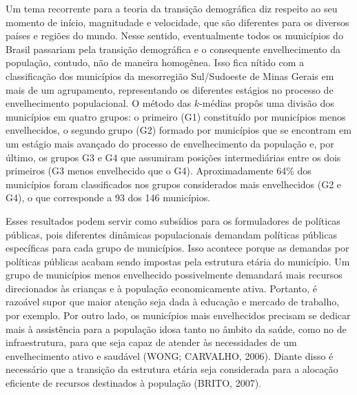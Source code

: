 \documentclass[10pt,twoside]{article}
\begin{document}
Um tema recorrente para a teoria da transição demográfica diz respeito ao seu momento de início, magnitudade e velocidade, que são diferentes para os diversos países e regiões do mundo. Nesse sentido, eventualmente todos os municípios do Brasil passariam pela transição demográfica e o consequente envelhecimento da população, contudo, não de maneira homogênea. Isso fica nítido com a classificação dos municípios da mesorregião Sul/Sudoeste de Minas Gerais em mais de um agrupamento, representando os diferentes estágios no processo de envelhecimento populacional. O método das $k$-médias propôs uma divisão dos municípios em quatro grupos: o primeiro (G1) constituído por municípios menos envelhecidos, o segundo grupo (G2) formado por municípios que se encontram em um estágio mais avançado do processo de envelhecimento da população e, por último, os grupos G3 e G4 que assumiram posições intermediárias entre os dois primeiros (G3 menos envelhecido que o G4). Aproximadamente 64\% dos municípios foram classificados nos grupos considerados mais envelhecidos (G2 e G4), o que corresponde a 93 dos 146 municípios. 

Esses resultados podem servir como subsídios para os formuladores de políticas públicas, pois diferentes dinâmicas populacionais demandam políticas públicas específicas para cada grupo de municípios. Isso acontece porque as demandas por políticas públicas acabam sendo impostas pela estrutura etária do município. Um grupo de municípios menos envelhecido possivelmente demandará mais recursos direcionados às crianças e à população economicamente ativa. Portanto, é razoável supor que maior atenção seja dada à educação e mercado de trabalho, por exemplo. Por outro lado, os municípios mais envelhecidos precisam se dedicar mais à assistência para a população idosa tanto no âmbito da saúde, como no de infraestrutura, para que seja capaz de atender às necessidades de um envelhecimento ativo e saudável (WONG; CARVALHO, 2006). Diante disso é necessário que a transição da estrutura etária seja considerada para a alocação eficiente de recursos destinados à população (BRITO, 2007).

	\medskip
	
	
	
	
	
\end{document}
